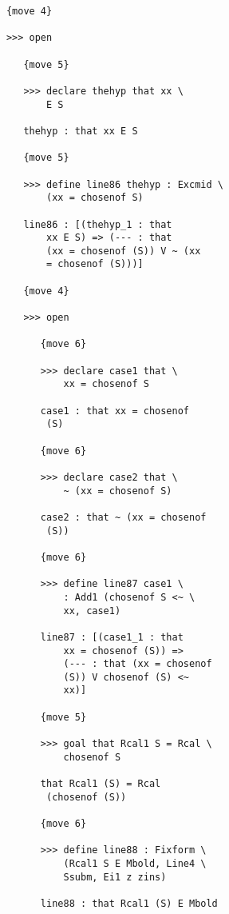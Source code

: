 \documentclass[12pt]{article}
\begin{document}
\begin{verbatim}
            {move 4}

            >>> open

               {move 5}

               >>> declare thehyp that xx \
                   E S

               thehyp : that xx E S

               {move 5}

               >>> define line86 thehyp : Excmid \
                   (xx = chosenof S)

               line86 : [(thehyp_1 : that 
                   xx E S) => (--- : that 
                   (xx = chosenof (S)) V ~ (xx 
                   = chosenof (S)))]

               {move 4}

               >>> open

                  {move 6}

                  >>> declare case1 that \
                      xx = chosenof S

                  case1 : that xx = chosenof 
                   (S)

                  {move 6}

                  >>> declare case2 that \
                      ~ (xx = chosenof S)

                  case2 : that ~ (xx = chosenof 
                   (S))

                  {move 6}

                  >>> define line87 case1 \
                      : Add1 (chosenof S <~ \
                      xx, case1)

                  line87 : [(case1_1 : that 
                      xx = chosenof (S)) => 
                      (--- : that (xx = chosenof 
                      (S)) V chosenof (S) <~ 
                      xx)]

                  {move 5}

                  >>> goal that Rcal1 S = Rcal \
                      chosenof S

                  that Rcal1 (S) = Rcal 
                   (chosenof (S))

                  {move 6}

                  >>> define line88 : Fixform \
                      (Rcal1 S E Mbold, Line4 \
                      Ssubm, Ei1 z zins)

                  line88 : that Rcal1 (S) E Mbold


\end{verbatim}
\end{document}
